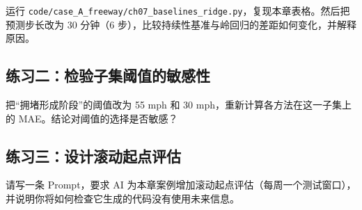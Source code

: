 运行 \texttt{code/case\_A\_freeway/ch07\_baselines\_ridge.py}，复现本章表格。然后把预测步长改为 30 分钟（6 步），比较持续性基准与岭回归的差距如何变化，并解释原因。

\subsection*{练习二：检验子集阈值的敏感性}

把“拥堵形成阶段”的阈值改为 55 mph 和 30 mph，重新计算各方法在这一子集上的 MAE。结论对阈值的选择是否敏感？

\subsection*{练习三：设计滚动起点评估}

请写一条 Prompt，要求 AI 为本章案例增加滚动起点评估（每周一个测试窗口），并说明你将如何检查它生成的代码没有使用未来信息。

